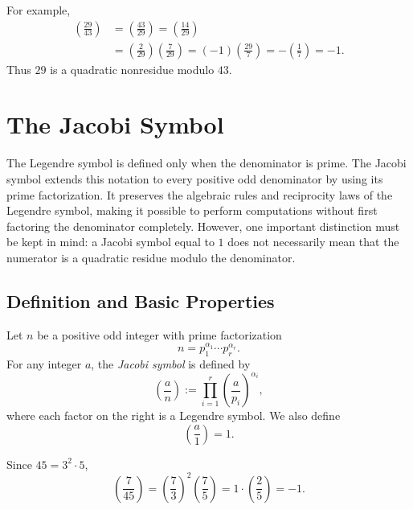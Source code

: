 \documentclass[a4paper,11pt,abstracton]{scrartcl}
\theoremstyle{dotlessP}
\theoremstyle{dotlessS}
\theoremstyle{remark}
\theoremstyle{definition}
\begin{document}
\begin{example_box}
For example,
\begin{align*}
    \left(\frac{29}{43}\right)
      &=\left(\frac{43}{29}\right)
       =\left(\frac{14}{29}\right)\\
      &=\left(\frac{2}{29}\right)
        \left(\frac{7}{29}\right)
       =(-1)\left(\frac{29}{7}\right)
       =-\left(\frac17\right)=-1.
\end{align*}
Thus $29$ is a quadratic nonresidue modulo $43$.
\end{example_box}

\section{The Jacobi Symbol}

The Legendre symbol is defined only when the denominator is prime.
The Jacobi symbol extends this notation to every positive odd
denominator by using its prime factorization. It preserves the
algebraic rules and reciprocity laws of the Legendre symbol, making it
possible to perform computations without first factoring the
denominator completely. However, one important distinction must be
kept in mind: a Jacobi symbol equal to $1$ does not necessarily mean
that the numerator is a quadratic residue modulo the denominator.

\subsection{Definition and Basic Properties}

\begin{definition_box}
Let $n$ be a positive odd integer with prime factorization
\[
    n=p_1^{\alpha_1}\cdots p_r^{\alpha_r}.
\]
For any integer $a$, the \emph{Jacobi symbol} is defined by
\[
    \left(\frac an\right)
      :=\prod_{i=1}^{r}
        \left(\frac{a}{p_i}\right)^{\alpha_i},
\]
where each factor on the right is a Legendre symbol. We also define
\[
    \left(\frac a1\right)=1.
\]
\end{definition_box}

\begin{example_box}
Since $45=3^2\cdot5$,
\[
    \left(\frac{7}{45}\right)
      =\left(\frac73\right)^2\left(\frac75\right)
      =1\cdot\left(\frac25\right)=-1.
\]
\end{example_box}
\end{document}
